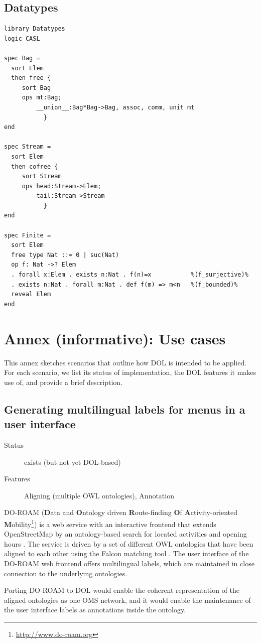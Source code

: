 \documentclass[10pt,fleqn,%
\ifpretendfinal
final%
\else
draft%
\fi,
]{scrreprt}
\newcommand{\sclause}[1]{\section{#1}}
\newcommand{\infannex}[1]{ \chapter{Annex (informative): #1} }
\begin{document}
\sclause{Datatypes}

\begin{lstlisting}[basicstyle=\ttfamily,language=dolText,morekeywords={props,ObjectProperty,Class,DisjointUnionOf,SubClassOf,Characteristics,Transitive,Asymmetric,SubPropertyOf,DisjointClasses,EquivalentTo,inverse,only,forall,iff,if,or,exists,sort,ops,in,approximate,extract,free,cofree,spec},escapechar=@,mathescape]
library Datatypes
logic CASL

spec Bag =
  sort Elem
  then free {
     sort Bag
     ops mt:Bag;
         __union__:Bag*Bag->Bag, assoc, comm, unit mt
           }
end

spec Stream =
  sort Elem
  then cofree {
     sort Stream
     ops head:Stream->Elem;
         tail:Stream->Stream
           }
end

spec Finite =
  sort Elem
  free type Nat ::= 0 | suc(Nat)
  op f: Nat ->? Elem
  . forall x:Elem . exists n:Nat . f(n)=x           %(f_surjective)%
  . exists n:Nat . forall m:Nat . def f(m) => m<n   %(f_bounded)%
  reveal Elem
end

\end{lstlisting}

\infannex{Use cases}\label{a:use-cases}

This annex sketches scenarios that outline how DOL is intended to be applied.  For each scenario, we list its status of implementation, the DOL features it makes use of, and provide a brief description.

\newenvironment{usecase}[3]{\sclause{#1}%
\begin{description}
\item[Status] #2
\item[Features] #3
\end{description}
}{}
\begin{usecase}{Generating multilingual labels for menus in a user interface}{exists (but not yet DOL-based)}{Aligning (multiple OWL ontologies), Annotation}
  DO-ROAM (\textbf{D}ata and \textbf{O}ntology driven \textbf{R}oute-finding \textbf{O}f \textbf{A}ctivity-oriented \textbf{M}obility\footnote{\url{http://www.do-roam.org}}) is a web service with an interactive frontend that extends OpenStreetMap by an ontology-based search for located activities and opening hours \cite{do-roam}.  The service is driven by a set of different OWL ontologies that have been aligned to each other using the Falcon matching tool \cite{HuQu-08}.  The user interface of the DO-ROAM web frontend offers multilingual labels, which are maintained in close connection to the underlying ontologies.

  Porting DO-ROAM to DOL would enable the coherent representation of the aligned ontologies as one OMS network, and it would enable  the maintenance of the user interface labels as annotations inside the ontology.
\end{usecase}
\end{document}
